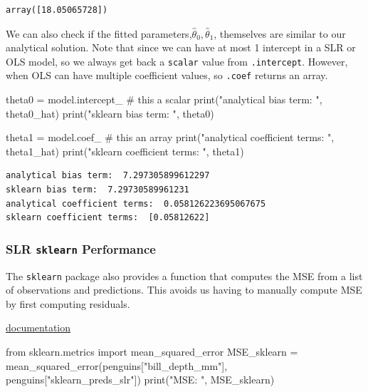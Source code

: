 \documentclass[
  letterpaper,
  DIV=11,
  numbers=noendperiod]{scrreprt}
\newenvironment{Shaded}{\begin{snugshade}}{\end{snugshade}}
\newcommand{\BuiltInTok}[1]{\textcolor[rgb]{0.00,0.23,0.31}{#1}}
\newcommand{\CommentTok}[1]{\textcolor[rgb]{0.37,0.37,0.37}{#1}}
\newcommand{\ImportTok}[1]{\textcolor[rgb]{0.00,0.46,0.62}{#1}}
\newcommand{\NormalTok}[1]{\textcolor[rgb]{0.00,0.23,0.31}{#1}}
\newcommand{\OperatorTok}[1]{\textcolor[rgb]{0.37,0.37,0.37}{#1}}
\newcommand{\StringTok}[1]{\textcolor[rgb]{0.13,0.47,0.30}{#1}}
\begin{document}
\begin{verbatim}
array([18.05065728])
\end{verbatim}

We can also check if the fitted
parameters,\(\hat{\theta}_0,\hat{\theta}_1\), themselves are similar to
our analytical solution. Note that since we can have at most 1 intercept
in a SLR or OLS model, so we always get back a \texttt{scalar} value
from \texttt{.intercept}. However, when OLS can have multiple
coefficient values, so \texttt{.coef} returns an array.

\begin{Shaded}
\begin{Highlighting}[]
\NormalTok{theta0 }\OperatorTok{=}\NormalTok{ model.intercept\_      }\CommentTok{\# this a scalar}
\BuiltInTok{print}\NormalTok{(}\StringTok{"analytical bias term: "}\NormalTok{, theta0\_hat)}
\BuiltInTok{print}\NormalTok{(}\StringTok{"sklearn bias term: "}\NormalTok{, theta0)}


\NormalTok{theta1 }\OperatorTok{=}\NormalTok{ model.coef\_           }\CommentTok{\# this an array}
\BuiltInTok{print}\NormalTok{(}\StringTok{"analytical coefficient terms: "}\NormalTok{, theta1\_hat)}
\BuiltInTok{print}\NormalTok{(}\StringTok{"sklearn coefficient terms: "}\NormalTok{, theta1)}
\end{Highlighting}
\end{Shaded}

\begin{verbatim}
analytical bias term:  7.297305899612297
sklearn bias term:  7.29730589961231
analytical coefficient terms:  0.058126223695067675
sklearn coefficient terms:  [0.05812622]
\end{verbatim}

\hypertarget{slr-sklearn-performance}{%
\subsubsection{\texorpdfstring{SLR \texttt{sklearn}
Performance}{SLR sklearn Performance}}\label{slr-sklearn-performance}}

The \texttt{sklearn} package also provides a function that computes the
MSE from a list of observations and predictions. This avoids us having
to manually compute MSE by first computing residuals.

\href{https://scikit-learn.org/stable/modules/generated/sklearn.metrics.mean_squared_error.html}{documentation}

\begin{Shaded}
\begin{Highlighting}[]
\ImportTok{from}\NormalTok{ sklearn.metrics }\ImportTok{import}\NormalTok{ mean\_squared\_error}
\NormalTok{MSE\_sklearn }\OperatorTok{=}\NormalTok{ mean\_squared\_error(penguins[}\StringTok{"bill\_depth\_mm"}\NormalTok{], penguins[}\StringTok{"sklearn\_preds\_slr"}\NormalTok{])}
\BuiltInTok{print}\NormalTok{(}\StringTok{"MSE: "}\NormalTok{, MSE\_sklearn)}
\end{Highlighting}
\end{Shaded}
\end{document}
